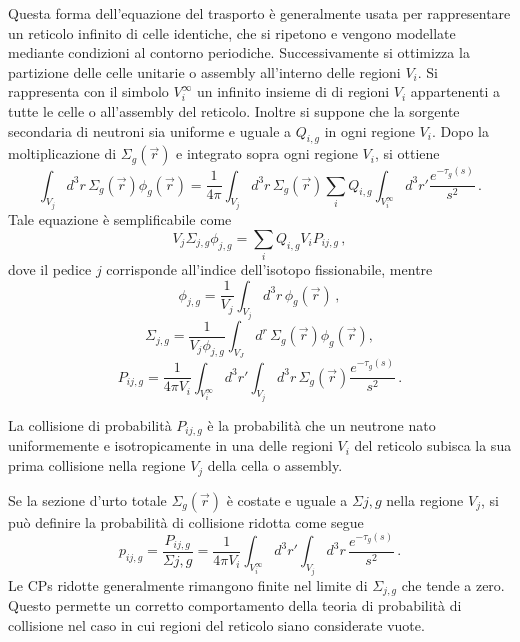 Questa forma dell'equazione del trasporto è generalmente usata per rappresentare 
un reticolo infinito di celle identiche, che si ripetono e vengono modellate
mediante  condizioni al contorno periodiche. Successivamente si ottimizza la 
partizione delle celle unitarie o assembly all'interno delle regioni $V_i$.
Si rappresenta con il simbolo $V_i^\infty$ un infinito insieme di di regioni 
$V_i$ appartenenti a tutte le celle o all'assembly del reticolo. Inoltre si 
suppone che la sorgente secondaria di neutroni sia uniforme e uguale a $Q_{i,g}$ 
in ogni regione $V_i$. 
Dopo la moltiplicazione di $\Sigma_g(\vec{r})$ e integrato sopra ogni regione 
$V_i$, si ottiene
\begin{equation}
\int_{V_j}d^3r \, \Sigma_g(\vec{r})\phi_g(\vec{r})=\frac{1}{4\pi}\int_{V_j}d^3r 
\, \Sigma_g(\vec{r})\sum	_i Q_{i,g}\int_{V_i^\infty} d^3r' 
\frac{e^{-\tau_g(s)}}{s^2} \,.
\end{equation}
Tale equazione è semplificabile come
\begin{equation}
\label{flussocps}
V_j\Sigma_{j,g}\phi_{j,g}=\sum_i Q_{i,g}V_iP_{ij,g} \,,
\end{equation}
dove il pedice $j$ corrisponde all'indice dell'isotopo fissionabile, mentre
\begin{equation}
\phi_{j,g}=\frac{1}{V_j}\int_{V_j} d^3r\,\phi_g(\vec{r}) \,,
\end{equation}
\begin{equation}
\Sigma_{j,g}=\frac{1}{V_j\phi_{j,g}}\int_{V_J}d^r\,\Sigma_g(\vec{r})\phi_g(\vec{
r}),
\end{equation}
\begin{equation}
P_{ij,g}=\frac{1}{4\pi 
V_i}\int_{V_i^\infty}d^3r'\int_{V_j}d^3r\,\Sigma_g(\vec{r})\frac{e^{-\tau_g(s)}}
{s^2} \,.
\end{equation}

La collisione di probabilità $P_{ij,g}$ è la probabilità che un neutrone nato 
uniformemente e isotropicamente in una delle regioni $V_i$ del reticolo subisca 
la sua prima collisione nella regione $V_j$ della cella o assembly.

Se la sezione d'urto totale $\Sigma_g(\vec{r})$ è costate e uguale a 
$\Sigma{j,g}$ nella regione $V_j$, si può definire la probabilità di collisione 
ridotta come segue
\begin{equation}
p_{ij,g}=\frac{P_{ij,g}}{\Sigma{j,g}}=\frac{1}{4\pi 
V_i}\int_{V_i^\infty}d^3r'\int_{V_j}d^3r\,\frac{e^{-\tau_g(s)}}{s^2} \,.
\end{equation}
Le CPs ridotte generalmente rimangono finite nel limite di $\Sigma_{j,g}$ che
tende a zero. Questo permette un corretto comportamento della teoria di 
probabilità di collisione nel caso in cui regioni del reticolo siano considerate 
vuote.

